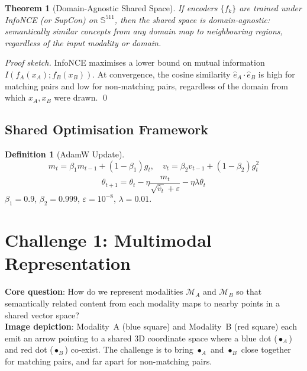 \documentclass[12pt,a4paper]{article}
\theoremstyle{definition}
\newtheorem{definition}{Definition}[section]
\theoremstyle{plain}
\newtheorem{theorem}{Theorem}[section]
\theoremstyle{remark}
\newcommand{\Sph}{\mathbb{S}}
\newcommand{\MA}{\mathcal{M}_A}
\newcommand{\MB}{\mathcal{M}_B}
\begin{document}
\begin{theorem}[Domain-Agnostic Shared Space]
\label{thm:shared}
If encoders $\{f_k\}$ are trained under InfoNCE (or SupCon) on $\Sph^{511}$, then the shared space is domain-agnostic: semantically similar concepts from any domain map to neighbouring regions, regardless of the input modality or domain.
\end{theorem}

\begin{proof}[Proof sketch]
InfoNCE maximises a lower bound on mutual information $I(f_A(x_A); f_B(x_B))$. At convergence, the cosine similarity $\hat{e}_A \cdot \hat{e}_B$ is high for matching pairs and low for non-matching pairs, regardless of the domain from which $x_A, x_B$ were drawn. \qed
\end{proof}

\subsection{Shared Optimisation Framework}

\begin{definition}[AdamW Update]
\[
  m_t = \beta_1 m_{t-1} + (1-\beta_1)g_t,\quad v_t = \beta_2 v_{t-1} + (1-\beta_2)g_t^2
\]
\[
  \theta_{t+1} = \theta_t - \eta\frac{\hat{m}_t}{\sqrt{\hat{v}_t}+\varepsilon} - \eta\lambda\theta_t
\]
$\beta_1=0.9$, $\beta_2=0.999$, $\varepsilon=10^{-8}$, $\lambda=0.01$.
\end{definition}

\newpage
\section{Challenge 1: Multimodal Representation}
\label{sec:repr}

\begin{tcolorbox}[challengebox,title={Challenge 1: Representation}]
\textbf{Core question}: How do we represent modalities $\MA$ and $\MB$ so that semantically related content from each modality maps to nearby points in a shared vector space?\\[4pt]
\textbf{Image depiction}: Modality~A (blue square) and Modality~B (red square) each emit an arrow pointing to a shared 3D coordinate space where a blue dot ($\bullet_A$) and red dot ($\bullet_B$) co-exist. The challenge is to bring $\bullet_A$ and $\bullet_B$ close together for matching pairs, and far apart for non-matching pairs.
\end{tcolorbox}
\end{document}

